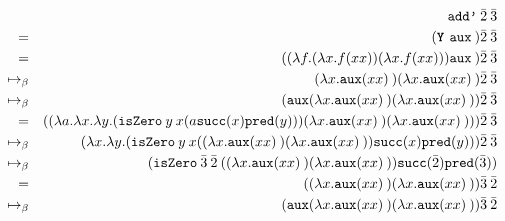 \documentclass[11pt]{article}
\begin{document}
\begin{enumerate}
	      \begin{align*}
		                    &  & \texttt{add'} \: \bar{2} \: \bar{3}                                                                                                                                                                             & \\
		      =             &  & (\textbf{\texttt{Y} } \texttt{aux} \: ) \bar{2} \: \bar{3}                                                                                                                                                      & \\
		      =             &  & (( \lambda f. ( \lambda x. f(xx))( \lambda x. f(xx))) \texttt{aux} \: ) \bar{2} \: \bar{3}                                                                                                                      & \\
		      \mapsto_\beta &  & ( \lambda x. \texttt{aux}(x x) \:)( \lambda x. \texttt{aux}(x x) \:) \bar{2} \: \bar{3}                                                                                                                         & \\
		      \mapsto_\beta &  & (\texttt{aux}( \lambda x. \texttt{aux}(x x) \:)( \lambda x. \texttt{aux}(x x) \:)) \bar{2} \: \bar{3}                                                                                                           & \\
		      =             &  & (( \lambda a. \lambda x. \lambda y. ( \texttt{isZero} \: y \: x ( a \texttt{succ}(x) \texttt{pred}(y)))( \lambda x. \texttt{aux}(x x) \:)( \lambda x. \texttt{aux}(x x) \:))) \bar{2} \: \bar{3}   & \\
		      \mapsto_\beta &  & ( \lambda x. \lambda y. ( \texttt{isZero} \: y \: x (( \lambda x. \texttt{aux}(x x) \:)( \lambda x. \texttt{aux}(x x) \:)) \texttt{succ}(x) \texttt{pred}(y))) \bar{2} \: \bar{3}                  & \\
		      \mapsto_\beta &  & ( \texttt{isZero} \: \bar{3} \: \bar{2} \: (( \lambda x. \texttt{aux}(x x) \:)( \lambda x. \texttt{aux}(x x) \:)) \texttt{succ}( \bar{2} ) \texttt{pred}( \bar{3} ))                              & \\
		      =             &  & (( \lambda x. \texttt{aux}(x x) \:)( \lambda x. \texttt{aux}(x x) \:)) \bar{3} \: \bar{2}                                                                                                                       & \\
		      \mapsto_\beta &  & ( \texttt{aux}( \lambda x. \texttt{aux}(x x) \:)( \lambda x. \texttt{aux}(x x) \:)) \bar{3} \: \bar{2}                                                                                                          & \\

\end{align*}
\end{enumerate}
\end{document}
